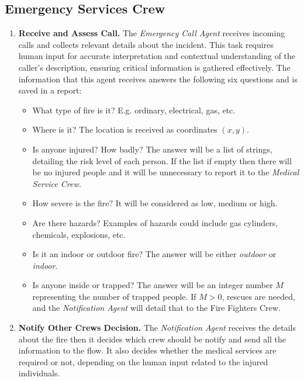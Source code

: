 \subsection{Emergency Services Crew}
\begin{enumerate}

    \item \textbf{Receive and Assess Call.} 
    The \textit{Emergency Call Agent} receives incoming calls and collects relevant details about the incident. 
    This task requires human input for accurate interpretation and contextual understanding of the caller's description, 
    ensuring critical information is gathered effectively. The information that this agent receives answers the following 
    six questions and is saved in a report:
    \begin{itemize}
        \item What type of fire is it? E.g. ordinary, electrical, gas, etc.
        \item Where is it? The location is received as coordinates \((x, y)\).
        \item Is anyone injured? How badly? The answer will be a list of strings, detailing the risk level of each person. If the list 
        if empty then there will be no injured people and it will be unnecessary to report it to the \textit{Medical Service Crew.}
        \item How severe is the fire? It will be considered as low, medium or high.
        \item Are there hazards? Examples of hazards could include gas cylinders, chemicals, explosions, etc.
        \item Is it an indoor or outdoor fire? The answer will be either \textit{outdoor} or \textit{indoor}.
        \item Is anyone inside or trapped? The answer will be an integer number $M$ representing the number of trapped people. 
        If $M > 0$, rescues are needed, and the \textit{Notification Agent} will detail that to the Fire Fighters Crew.
    \end{itemize}
    

    \item \textbf{Notify Other Crews Decision.} 
    The \textit{Notification Agent} receives the details about the fire then it decides which crew should be notify and send
    all the information to the flow. It also decides whether the medical services are required or not, depending on the 
    human input related to the injured individuals.    

\end{enumerate}


